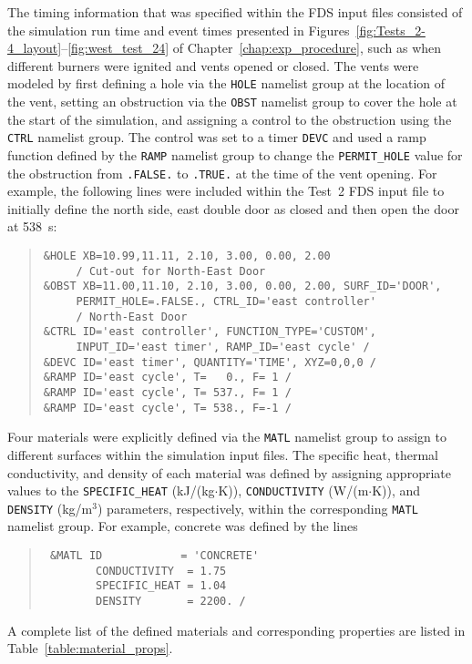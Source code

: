 The timing information that was specified within the FDS input files consisted of the simulation run time and event times presented in Figures~\ref{fig:Tests_2-4_layout}--\ref{fig:west_test_24} of Chapter~\ref{chap:exp_procedure}, such as when different burners were ignited and vents opened or closed. The vents were modeled by first defining a hole via the \verb|HOLE| namelist group at the location of the vent, setting an obstruction via the \verb|OBST| namelist group to cover the hole at the start of the simulation, and assigning a control to the obstruction using the \verb|CTRL| namelist group. The control was set to a timer \verb|DEVC| and used a ramp function defined by the \verb|RAMP| namelist group to change the \verb|PERMIT_HOLE| value for the obstruction from \verb|.FALSE.| to \verb|.TRUE.| at the time of the vent opening. For example, the following lines were included within the Test~2 FDS input file to initially define the north side, east double door as closed and then open the door at 538~s:
\begin{quote}
\begin{verbatim}
&HOLE XB=10.99,11.11, 2.10, 3.00, 0.00, 2.00 
     / Cut-out for North-East Door
&OBST XB=11.00,11.10, 2.10, 3.00, 0.00, 2.00, SURF_ID='DOOR', 
     PERMIT_HOLE=.FALSE., CTRL_ID='east controller' 
     / North-East Door
&CTRL ID='east controller', FUNCTION_TYPE='CUSTOM', 
     INPUT_ID='east timer', RAMP_ID='east cycle' /
&DEVC ID='east timer', QUANTITY='TIME', XYZ=0,0,0 /
&RAMP ID='east cycle', T=   0., F= 1 /
&RAMP ID='east cycle', T= 537., F= 1 /
&RAMP ID='east cycle', T= 538., F=-1 /
\end{verbatim}
\end{quote}

Four materials were explicitly defined via the \verb|MATL| namelist group to assign to different surfaces within the simulation input files. The specific heat, thermal conductivity, and density of each material was defined by assigning appropriate values to the \verb|SPECIFIC_HEAT| (kJ/(kg$\cdot$K)), \verb|CONDUCTIVITY| (W/(m$\cdot$K)), and \verb|DENSITY| (kg/m$^3$) parameters, respectively, within the corresponding \verb|MATL| namelist group. For example, concrete was defined by the lines
\begin{quote}
\begin{verbatim}
 &MATL ID            = 'CONCRETE'                                              
        CONDUCTIVITY  = 1.75        
        SPECIFIC_HEAT = 1.04       
        DENSITY       = 2200. /
\end{verbatim}
\end{quote}
A complete list of the defined materials and corresponding properties are listed in Table~\ref{table:material_props}.


